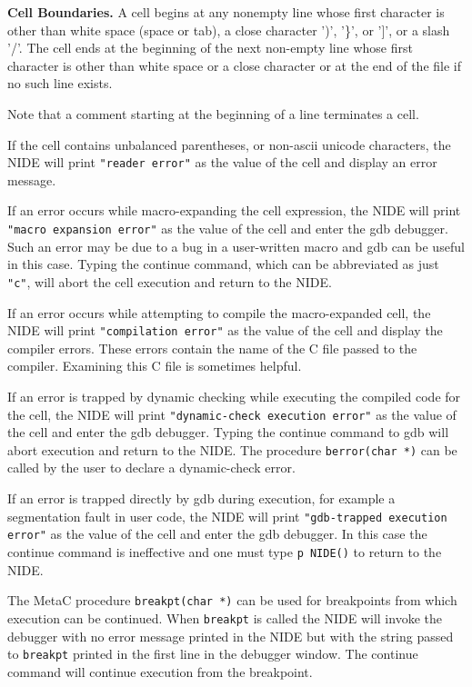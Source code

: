 \documentclass{article}
\begin{document}
{\bf Cell Boundaries.}
A cell begins at any nonempty line whose first character is other than white space (space or tab), a close character ')', '\}', or ']', or a slash '/'.
The cell ends at the beginning of the next non-empty line whose first character is other than white space or a close character
or at the end of the file if no such line exists.

Note that a comment
starting at the beginning of a line terminates a cell.


If the cell contains unbalanced parentheses, or non-ascii unicode characters, the NIDE will print {\tt "reader error"} as the value of the cell and display an error message.

If an error occurs while macro-expanding the cell expression, the NIDE will print {\tt "macro expansion error"} as the value of the cell and enter the gdb debugger.  Such an error may be
due to a bug in a user-written macro and gdb can be useful in this case.  Typing the continue command, which can be abbreviated as just {\tt "c"}, will abort the cell execution and return to the NIDE.

If an error occurs while attempting to compile the macro-expanded cell, the NIDE will print {\tt "compilation error"} as the value of the cell
and display the compiler errors.  These errors contain the name of the C file passed to the compiler.  Examining this C file is sometimes helpful.

If an error is trapped by dynamic checking while executing the compiled code for the cell, the NIDE will print {\tt "dynamic-check execution error"} as the value of the cell and enter the gdb debugger.
Typing the continue command to gdb will abort execution and return to the NIDE. The procedure {\tt berror(char *)} can be called by the user to declare a dynamic-check error.

If an error is trapped directly by gdb during execution, for example a segmentation fault in user code, the NIDE will print {\tt "gdb-trapped execution error"} as the value of the cell and enter the gdb debugger.
In this case the continue command is ineffective and one must type {\tt p NIDE()} to return to the NIDE.

The MetaC procedure {\tt breakpt(char *)} can be used for breakpoints
from which execution can be continued.  When {\tt breakpt} is called
the NIDE will invoke the debugger with no error message printed in the NIDE but with the string passed to {\tt breakpt} printed in the first line in the debugger window.
The continue command will continue execution from the breakpoint.
\end{document}
